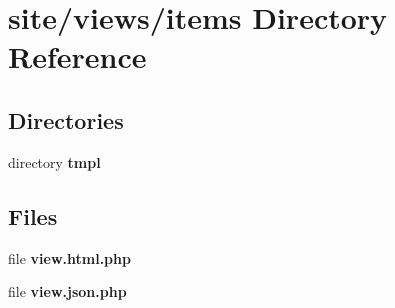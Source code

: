 \section{site/views/items Directory Reference}
\label{dir_b1a1ce7a0e4c9df6910263f99800a863}
\subsection*{Directories}
\begin{DoxyCompactItemize}
\item 
directory \textbf{ tmpl}
\end{DoxyCompactItemize}
\subsection*{Files}
\begin{DoxyCompactItemize}
\item 
file \textbf{ view.\+html.\+php}
\item 
file \textbf{ view.\+json.\+php}
\end{DoxyCompactItemize}
